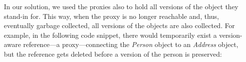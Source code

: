 
% 
% 
% 
% 
% 
% 
% 
% 
% 
% 
% 
% 





In our solution, we used the proxies also to hold all versions of the object they stand-in for.
This way, when the proxy is no longer reachable and, thus, eventually garbage collected, all versions of the objects are also collected.
For example, in the following code snippet, there would temporarily exist a version-aware reference---a proxy---connecting the \emph{Person} object to an \emph{Address} object, but the reference gets deleted before a version of the person is preserved:



